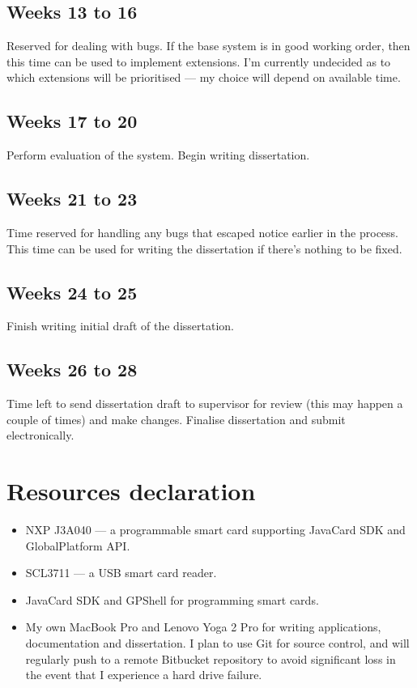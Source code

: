 \documentclass[12pt,a4paper,twoside]{article}
\begin{document}
\subsection*{Weeks 13 to 16}

Reserved for dealing with bugs. If the base system is in good working order, then this time can be used to implement extensions. I'm currently undecided as to which extensions will be prioritised --- my choice will depend on available time.

\subsection*{Weeks 17 to 20}

Perform evaluation of the system. Begin writing dissertation.

\subsection*{Weeks 21 to 23}

Time reserved for handling any bugs that escaped notice earlier in the process. This time can be used for writing the dissertation if there's nothing to be fixed.

\subsection*{Weeks 24 to 25}

Finish writing initial draft of the dissertation.

\subsection*{Weeks 26 to 28}

Time left to send dissertation draft to supervisor for review (this may happen a couple of times) and make changes. Finalise dissertation and submit electronically.

\section*{Resources declaration}

\begin{itemize}
\item NXP J3A040 --- a programmable smart card supporting JavaCard SDK and GlobalPlatform API.
\item SCL3711 --- a USB smart card reader.
\item JavaCard SDK and GPShell for programming smart cards.
\item My own MacBook Pro and Lenovo Yoga 2 Pro for writing applications,
documentation and dissertation. I plan to use Git for source control, and will regularly push to a remote Bitbucket repository to avoid significant loss in the event that I experience a hard drive failure.
\end{itemize}
\end{document}
